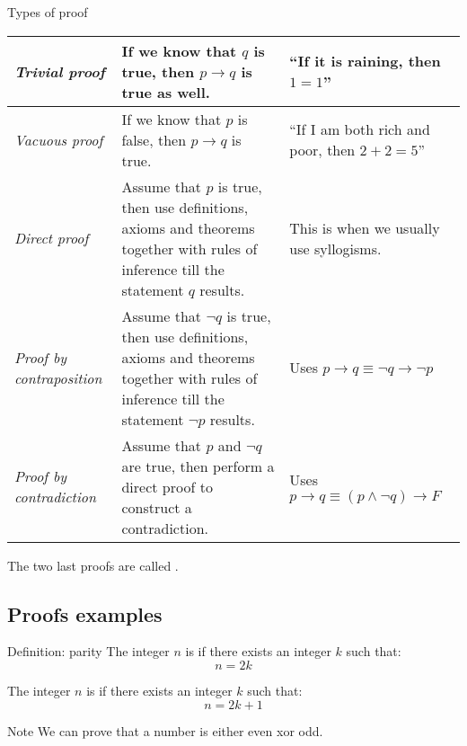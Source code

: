 \documentclass{article}
\begin{document}
\begin{parag}{Types of proof}
    \begin{center}
    \begin{tabularx}{\linewidth}{|>{\hsize=0.25\hsize}X>{\hsize=0.4\hsize}X>{\hsize=0.35\hsize}X|}
        \hline
        \textit{Trivial proof} & If we know that $q$ is true, then $p \to q$ is true as well. & ``If it is raining, then $1 = 1$'' \\
        \hline
        \textit{Vacuous proof} & If we know that $p$ is false, then $p\to q$ is true. & ``If I am both rich and poor, then $2 + 2 = 5$'' \\
        \hline
        \textit{Direct proof} & Assume that $p$ is true, then use definitions, axioms and theorems together with rules of inference till the statement $q$ results. & This is when we usually use syllogisms. \\
        \hline
        \textit{Proof by contraposition} & Assume that $\lnot q$ is true, then use definitions, axioms and theorems together with rules of inference till the statement $\lnot p$ results. & Uses $p \to q \equiv \lnot q \to \lnot p$\\
        \hline
        \textit{Proof by contradiction} & Assume that $p$ and $\lnot q$ are true, then perform a direct proof to construct a contradiction. & Uses $p \to q \equiv \left(p \land \lnot q\right) \to F$ \\
        \hline
    \end{tabularx}
    \end{center}

    The two last proofs are called .
\end{parag}

\subsection{Proofs examples}
\begin{parag}{Definition: parity}
    The integer $n$ is  if there exists an integer $k$ such that:
    \[n = 2k\]

    The integer $n$ is  if there exists an integer $k$ such that:
    \[n = 2k + 1\]

    \begin{subparag}{Note}
        We can prove that a number is either even xor odd.
    \end{subparag}
\end{parag}
\end{document}
